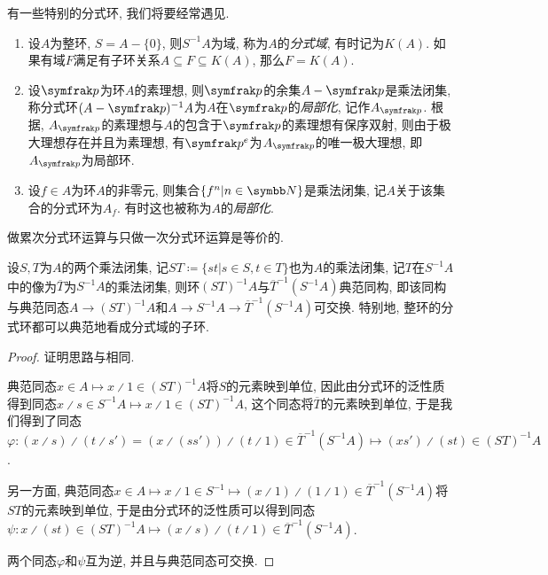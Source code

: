 \begin{example}
  有一些特别的分式环, 我们将要经常遇见.
  \begin{enumerate}
    \item 设$A$为整环, $S=A-\{0\}$, 则$S^{-1}A$为域, 称为$A$的\emph{分式域}, 有时记为$K(A)$. 如果有域$F$满足有子环关系$A\subseteq F\subseteq K(A)$, 那么$F=K(A)$.
    \item 设$\ideal{p}$为环$A$的素理想, 则$\ideal{p}$的余集$A-\ideal{p}$是乘法闭集, 称分式环$(A-\ideal{p})^{-1}A$为$A$在$\ideal{p}$的\emph{局部化}, 记作$A_{\ideal{p}}$. 根据, $A_{\ideal{p}}$的素理想与$A$的包含于$\ideal{p}$的素理想有保序双射, 则由于极大理想存在并且为素理想, 有$\ideal{p}^e$为$A_{\ideal{p}}$的唯一极大理想, 即$A_{\ideal{p}}$为局部环.
    \item 设$f\in A$为环$A$的非零元, 则集合$\{f^n\vert n\in \NN\}$是乘法闭集, 记$A$关于该集合的分式环为$A_f$. 有时这也被称为$A$的\emph{局部化}.
  \end{enumerate}
\end{example}

做累次分式环运算与只做一次分式环运算是等价的.

\begin{proposition}\label{prop:multilocalization}
  设$S, T$为$A$的两个乘法闭集, 记$ST\coloneq \{st\vert s\in S, t\in T\}$也为$A$的乘法闭集, 记$T$在$S^{-1}A$中的像为$\overline{T}$为$S^{-1}A$的乘法闭集, 则环$(ST)^{-1}A$与$\overline{T}^{-1}(S^{-1}A)$典范同构, 即该同构与典范同态$A\to (ST)^{-1}A$和$A\to S^{-1}A\to \overline{T}^{-1}(S^{-1}A)$可交换. 特别地, 整环的分式环都可以典范地看成分式域的子环.
\end{proposition}

\begin{proof}
  证明思路与相同.

  典范同态$x\in A\mapsto x{\divslash}1\in(ST)^{-1}A$将$S$的元素映到单位, 因此由分式环的泛性质得到同态$x{\divslash}s\in S^{-1}A\mapsto x{\divslash}1\in (ST)^{-1}A$, 这个同态将$\overline{T}$的元素映到单位, 于是我们得到了同态$\varphi\colon (x{\divslash}s){\divslash}(t{\divslash}s')=(x{\divslash}(ss')){\divslash}(t{\divslash}1)\in \overline{T}^{-1}(S^{-1}A)\mapsto (xs'){\divslash}(st)\in (ST)^{-1}A$.

  另一方面, 典范同态$x\in A\mapsto x{\divslash}1\in S^{-1}\mapsto (x{\divslash}1){\divslash}(1{\divslash}1)\in \overline{T}^{-1}(S^{-1}A)$将$ST$的元素映到单位, 于是由分式环的泛性质可以得到同态$\psi\colon x{\divslash}(st)\in (ST)^{-1}A\mapsto (x{\divslash}s){\divslash}(t{\divslash}1)\in\overline{T}^{-1}(S^{-1}A)$.

  两个同态$\varphi$和$\psi$互为逆, 并且与典范同态可交换.
\end{proof}

